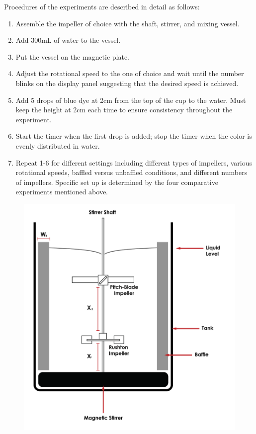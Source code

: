Procedures of the experiments are described in detail as follows: 
\begin{enumerate}
	\item Assemble the impeller of choice with the shaft, stirrer, and mixing vessel. 
	\item Add 300mL of water to the vessel. 
	\item Put the vessel on the magnetic plate. 
	\item Adjust the rotational speed to the one of choice and wait until the number blinks on the display panel suggesting that the desired speed is achieved. 
	\item Add 5 drops of blue dye at 2cm from the top of the cup to the water. Must keep the height at 2cm each time to ensure consistency throughout the experiment.  
	\item Start the timer when the first drop is added; stop the timer when the color is evenly distributed in water. 
	\item Repeat 1-6 for different settings including different types of impellers, various rotational speeds, baffled versus unbaffled conditions, and different numbers of impellers. Specific set up is determined by the four comparative experiments mentioned above.  
\end{enumerate}

\begin{figure}[h]
	\includegraphics[width=\textwidth]{Stirrer.png}
	\caption{}
\end{figure}








